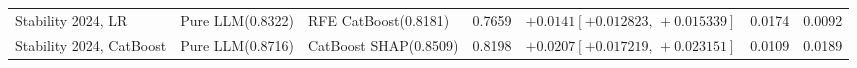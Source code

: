 \documentclass[final,5p,twocolumn]{elsarticle}
\begin{document}
\begin{table}[htbp]
\begin{threeparttable}
\begin{tabular}{@{}L{24mm}L{27mm}L{24mm}rL{38mm}rr@{}}
\addlinespace
Stability 2024, LR & Pure LLM\newline (0.8322) & RFE CatBoost\newline (0.8181) & 0.7659 & $+0.0141$\newline $[+0.012823,\,+0.015339]$ & 0.0174 & 0.0092 \\
\addlinespace
Stability 2024, CatBoost & Pure LLM\newline (0.8716) & CatBoost SHAP\newline (0.8509) & 0.8198 & $+0.0207$\newline $[+0.017219,\,+0.023151]$ & 0.0109 & 0.0189 \\
\bottomrule
\end{tabular}
\end{threeparttable}
\end{table}
\end{document}

